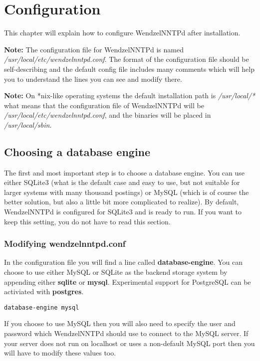 \chapter{Configuration}

This chapter will explain how to configure WendzelNNTPd after installation.

\textbf{Note:} The configuration file for WendzelNNTPd is named \textit{/usr/local/etc/wendzelnntpd.conf}. The format of the configuration file should be self-describing and the default config file includes many comments which will help you to understand the lines you can see and modify there.

\textbf{Note:} On *nix-like operating systems the default installation path is \textit{/usr/local/*} what means that the configuration file of WendzelNNTPd will be \textit{/usr/local/etc/wendzelnntpd.conf}, and the binaries will be placed in \textit{/usr/local/sbin}. %

\section{Choosing a database engine}

The first and most important step is to choose a database engine. You can use either SQLite3 (what is the default case and easy to use, but not suitable for larger systems with many thousand postings) or MySQL (which is of course the better solution, but also a little bit more complicated to realize). By default, WendzelNNTPd is configured for SQLite3 and is ready to run. If you want to keep this setting, you do not have to read this section.

\subsection{Modifying wendzelnntpd.conf}

In the configuration file you will find a line called \textbf{database-engine}. You can choose to use either MySQL or SQLite as the backend storage system by appending either \textbf{sqlite} or \textbf{mysql}. Experimental support for PostgreSQL can be activiated with \textbf{postgres}.

\begin{verbatim}
database-engine mysql
\end{verbatim}

If you choose to use MySQL then you will also need to specify the user and password which WendzelNNTPd should use to connect to the MySQL server. If your server does not run on localhost or uses a non-default MySQL port then you will have to modify these values too.

